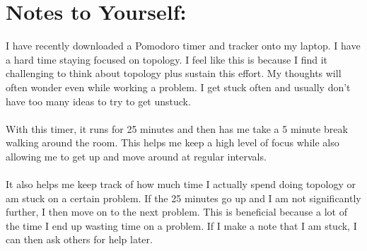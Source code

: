 \documentclass[10pt]{article}
\begin{document}
\section*{Notes to Yourself:}
I have recently downloaded a Pomodoro timer and tracker onto my laptop. I have a hard time staying focused on topology. I feel like this is because I find it challenging to think about topology plus sustain this effort. My thoughts will often wonder even while working a problem. I get stuck often and usually don't have too many ideas to try to get unstuck.\\
\\
 With this timer, it runs for 25 minutes and then has me take a 5 minute break walking around the room. This helps me keep a high level of focus while also allowing me to get up and move around at regular intervals.\\
 \\
  It also helps me keep track of how much time I actually spend doing topology or am stuck on a certain problem. If the 25 minutes go up and I am not significantly further, I then move on to the next problem. This is beneficial because a lot of the time I end up wasting time on a problem. If I make a note that I am stuck, I can then ask others for help later.
\end{document}
